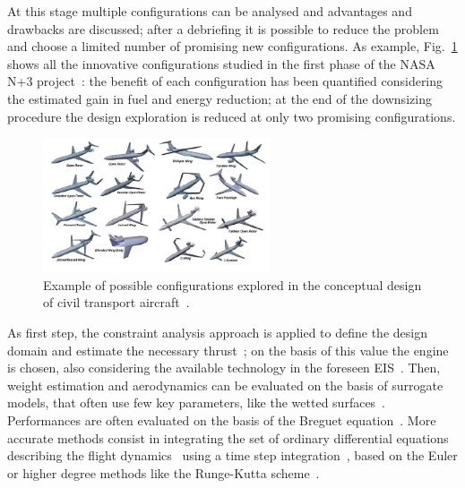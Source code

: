 At this stage multiple configurations can be analysed and advantages and drawbacks are discussed; after a debriefing it is possible to reduce the problem and choose a limited number of promising new configurations. 
As example, Fig.~\ref{fig:conceptual_design_example} shows all the innovative configurations studied in the first phase of the NASA N+3 project~\cite{bib:raymer_concept_design}: the benefit of each configuration has been quantified considering the estimated gain in fuel and energy reduction; at the end of the downsizing procedure the design exploration is reduced at only two promising configurations.
\begin{figure}[!h]
	\centering
	\includegraphics[keepaspectratio, width=0.6\textwidth]{images/chap1/conceptual_design_example.jpg}
	\caption{Example of possible configurations explored in the conceptual design of civil transport aircraft~\cite{bib:raymer_concept_design}.}
	\label{fig:conceptual_design_example}
\end{figure}

As first step, the constraint analysis approach is applied to define the design domain and estimate the necessary thrust~\cite{bib:roskam_partI}; on the basis of this value the engine is chosen, also considering the available technology in the foreseen EIS~\cite{bib:roskam_partII}. 
Then, weight estimation and aerodynamics can be evaluated on the basis of surrogate models, that often use few key parameters, like the wetted surfaces~\cite{bib:roskam_partV, bib:roskam_partVI}.
Performances are often evaluated on the basis of the Breguet equation~\cite{bib:anderson_perfo, bib:roskam_perfo, bib:phillips}.
More accurate methods consist in integrating the set of ordinary differential equations describing the flight dynamics~\cite{bib:roskam_flight_dynamics} using a time step integration~\cite{bib:sforza}, based on the Euler or higher degree methods like the Runge-Kutta scheme~\cite{bib:leveque_partial_equation}.

